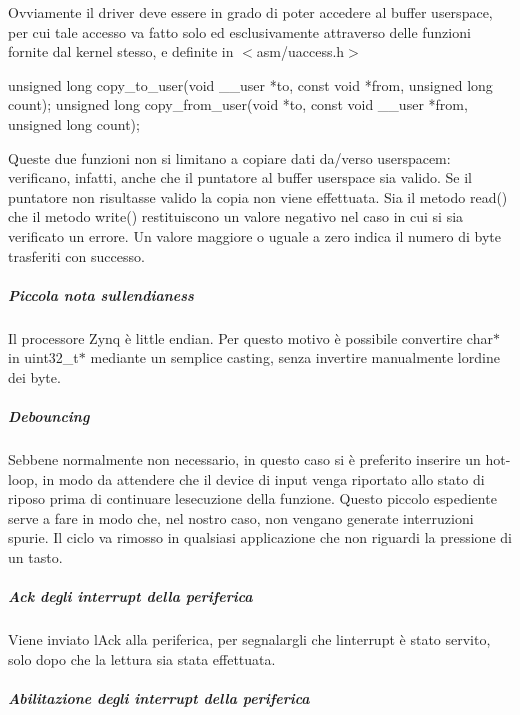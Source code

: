 Ovviamente il driver deve essere in grado di poter accedere al buffer userspace, per cui tale accesso va fatto solo ed esclusivamente attraverso delle funzioni fornite dal kernel stesso, e definite in $<$asm/uaccess.\+h$>$ 
\begin{DoxyCode}
\textcolor{keywordtype}{unsigned} \textcolor{keywordtype}{long} copy\_to\_user(\textcolor{keywordtype}{void} \_\_user *to, \textcolor{keyword}{const} \textcolor{keywordtype}{void} *from, \textcolor{keywordtype}{unsigned} \textcolor{keywordtype}{long} count);
\textcolor{keywordtype}{unsigned} \textcolor{keywordtype}{long} copy\_from\_user(\textcolor{keywordtype}{void} *to, \textcolor{keyword}{const} \textcolor{keywordtype}{void} \_\_user *from, \textcolor{keywordtype}{unsigned} \textcolor{keywordtype}{long} count);
\end{DoxyCode}
 Queste due funzioni non si limitano a copiare dati da/verso userspacem\+: verificano, infatti, anche che il puntatore al buffer userspace sia valido. Se il puntatore non risultasse valido la copia non viene effettuata. Sia il metodo read() che il metodo write() restituiscono un valore negativo nel caso in cui si sia verificato un errore. Un valore maggiore o uguale a zero indica il numero di byte trasferiti con successo.

\subparagraph*{Piccola nota sull\textquotesingle{}endianess}

Il processore Zynq è little endian. Per questo motivo è possibile convertire char$\ast$ in uint32\+\_\+t$\ast$ mediante un semplice casting, senza invertire manualmente l\textquotesingle{}ordine dei byte.

\subparagraph*{Debouncing}

Sebbene normalmente non necessario, in questo caso si è preferito inserire un hot-\/loop, in modo da attendere che il device di input venga riportato allo stato di riposo prima di continuare l\textquotesingle{}esecuzione della funzione. Questo piccolo espediente serve a fare in modo che, nel nostro caso, non vengano generate interruzioni spurie. Il ciclo va rimosso in qualsiasi applicazione che non riguardi la pressione di un tasto.

\subparagraph*{Ack degli interrupt della periferica}

Viene inviato l\textquotesingle{}Ack alla periferica, per segnalargli che l\textquotesingle{}interrupt è stato servito, solo dopo che la lettura sia stata effettuata.

\subparagraph*{Abilitazione degli interrupt della periferica}

